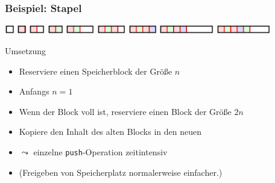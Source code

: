 \documentclass[aspectratio=1610, 11pt]{beamer}
\begin{document}
\begin{frame}\frametitle{Beispiel: Stapel}
	\begin{overprint} 
		\hspace{50mm}\includegraphics[height=4mm]{images/stack00.pdf}
		\onslide<2>\hspace{50mm}\includegraphics[height=4mm]{images/stack01.pdf}
		\onslide<3>\hspace{50mm}\includegraphics[height=4mm]{images/stack02.pdf}
		\onslide<4>\hspace{50mm}\includegraphics[height=4mm]{images/stack03.pdf}
		\onslide<5>\hspace{50mm}\includegraphics[height=4mm]{images/stack04.pdf}
		\onslide<6>\hspace{50mm}\includegraphics[height=4mm]{images/stack05.pdf}
		\onslide<7>\hspace{50mm}\includegraphics[height=4mm]{images/stack06.pdf}
		\onslide<8>\hspace{50mm}\includegraphics[height=4mm]{images/stack07.pdf}
		\onslide<9>\hspace{50mm}\includegraphics[height=4mm]{images/stack08.pdf}
	\end{overprint}
	\begin{exampleblock}{Umsetzung}
		\begin{itemize}
			\item Reserviere einen Speicherblock der Gr\"o\ss e $n$
			\item Anfangs $n=1$
			\item Wenn der Block voll ist, reserviere einen Block der Gr\"o\ss e $2n$
			\item Kopiere den Inhalt des alten Blocks in den neuen
			\item $\leadsto$ einzelne {\tt push}-Operation zeitintensiv
			\item (Freigeben von Speicherplatz normalerweise einfacher.)
		\end{itemize}
	\end{exampleblock}
\end{frame}
\end{document}
